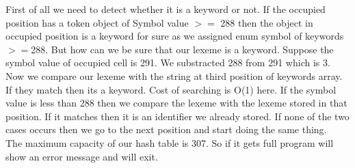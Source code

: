 \documentclass[paper=letter, fontsize=12pt]{scrartcl} %
\begin{document}
First of all we need to detect whether it is a keyword or not. If the occupied position has a token object of Symbol value $>=$ 288 then the object in occupied position is a keyword for sure as we assigned enum symbol of keywords $>=$288. But how can we be sure that our lexeme is a keyword. Suppose the symbol value of occupied cell is 291. We substracted 288 from 291 which is 3. Now we compare our lexeme with the string at third position of keywords array. If they match then its a keyword. Cost of searching is O(1) here. If the symbol value is less than 288 then we compare the lexeme with the lexeme stored in that position. If it matches then it is an identifier we already stored. If none of the two cases occurs then we go to the next position and start doing the same thing.\\

The maximum capacity of our hash table is 307. So if it gets full program will show an error message and will exit.  \\
\end{document}
